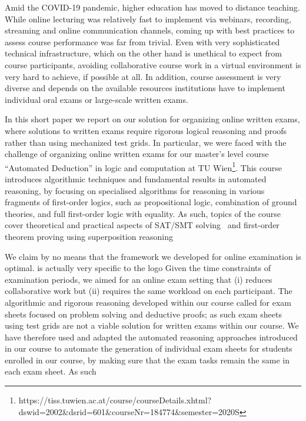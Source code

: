 Amid the COVID-19 pandemic, higher education has moved to distance
teaching. While online lecturing was relatively fast to implement via
webinars, recording,  streaming and online communication channels,
coming up with best practices to assess course performance was far
from trivial. Even with very sophisticated technical infrastructure,
which on the other hand is unethical to expect from course
participants,  avoiding collaborative course work in a virtual
environment is very hard to achieve, if possible at all.
In addition, course assessment is very diverse and depends on the
available resources institutions have to implement individual oral
exams or large-scale written exams.

In this short paper we report on our solution for organizing online
written exams, where solutions to written exams require rigorous
logical reasoning and proofs rather than using mechanized test grids.
In particular, we were faced with the challenge of organizing online
written exams for our master's level course ``Automated
Deduction'' in logic and computation at TU
Wien\footnote{https://tiss.tuwien.ac.at/course/courseDetails.xhtml?dswid=2002\&dsrid=601\&courseNr=184774\&semester=2020S}.
This course introduces algorithmic techniques and fundamental results
in automated reasoning, by focusing on specialised algorithms for
reasoning in various fragments of first-order logics, such as
propositional logic, combination of ground theories, and full
first-order logic with equality.
As such, topics of the course cover theoretical and practical
aspects of SAT/SMT solving~\cite{DPLLTinelli,NelsonOppen} and first-order theorem proving using
superposition reasoning~\cite{Ganzinger02,Rubio02,Vampire13}

We claim by no means that the framework we developed for online
examination is optimal.
is actually very specific to the logo
Given the time constraints of examination periods, we aimed for an
online exam setting that (i) reduces collaborative work but (ii)
requires the same workload on each participant.
The algorithmic and rigorous reasoning developed within our
course called for exam sheets focused on problem solving and deductive
proofs; as such exam sheets using test grids are not a viable solution
for written exams within our course.
We have therefore used and adapted the automated reasoning approaches introduced in our
course to automate the generation of individual exam sheets for
students enrolled in our course, by making sure that the exam tasks
remain the same in each exam sheet. As such

